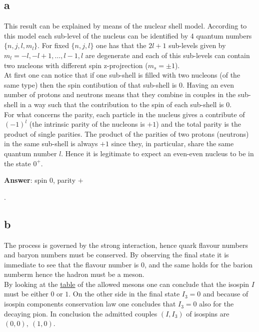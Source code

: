 \subsection*{a}
This result can be explained by means of the nuclear shell model. According to this model each sub-level of the nucleus can be identified by 4 quantum numbers $\{n, j, l, m_l\}$. For fixed $\{n, j, l\}$ 
one has that the $2l+1$ sub-levels given by $m_l = -l, -l+1, \dots, l-1, l$ are degenerate and each of this sub-levels can contain two nucleons with different spin z-projrection ($m_s = \pm 1$). \\
At first one can notice that if one sub-shell is filled with two nucleons (of the same type) then the spin contibution of that sub-shell is 0. Having an even number of protons and neutrons means that 
they combine in couples in the sub-shell in a way such that the contribution to the spin of each sub-shell is 0. \\
For what concerns the parity, each particle in the nucleus gives a contribute of $(-1)^l$ (the intrinsic parity of the nucleons is $+1$) and the total parity is the product of single parities. 
The product of the parities of two protons (neutrons) in the same sub-shell is always $+1$ since they, in particular, share the same quantum number $l$. Hence it is legitimate to expect an even-even nucleus
to be in the state $0^+$.
\vspace{10pt} \\
\centerline{\textbf{Answer}: spin $0$, parity $+$}.

\subsection*{b}
The process is governed by the strong interaction, hence quark flavour numbers and baryon numbers must be conserved.
By observing the final state it is immediate to see that the flavour number is 0, and the same holds for the barion numberm hence the
hadron must be a meson. \\
By looking at the \href{https://en.wikipedia.org/wiki/Meson#List}{table} of the allowed mesons one can conclude that the isospin $I$ must be either $0$ or $1$. 
On the other side in the final state $I_3=0$ and because of isospin components conservation law one concludes that $I_3=0$ also for the decaying pion.
In conclusion the admitted couples $(I, I_3)$ of isospins are $(0, 0), \ (1, 0)$.


